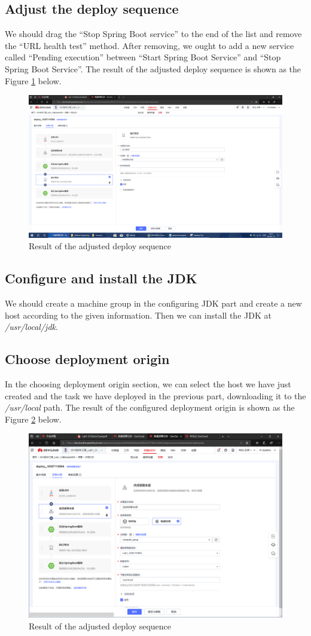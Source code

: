 \documentclass[a4paper]{report}
\begin{document}
\subsection{Adjust the deploy sequence}
We should drag the ``Stop Spring Boot service'' to the end of the list and remove the ``URL health test'' method. After removing, we ought to add a new service called ``Pending execution'' between ``Start Spring Boot Service'' and ``Stop Spring Boot Service''. The result of the adjusted deploy sequence is shown as the Figure \ref{8} below.
\begin{figure}
  \centering
  \includegraphics[width=12cm]{Figures/Screenshot(34).png}
  \caption{Result of the adjusted deploy sequence}\label{8}
\end{figure}
\subsection{Configure and install the JDK}
We should create a machine group in the configuring JDK part and create a new host according to the given information. Then we can install the JDK at \emph{/usr/local/jdk}.
\subsection{Choose deployment origin}
In the choosing deployment origin section, we can select the host we have just created and the task we have deployed in the previous part, downloading it to the \emph{/usr/local} path. The result of the configured deployment origin is shown as the Figure \ref{9} below.
\begin{figure}
  \centering
  \includegraphics[width=12cm]{Figures/Capture6.png}
  \caption{Result of the adjusted deploy sequence}\label{9}
\end{figure}
\end{document}
